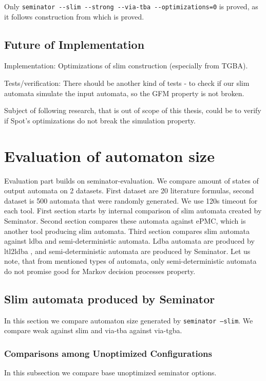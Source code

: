 \documentclass[
	digital,
nolof, nolot
]{fithesis3}
\begin{document}
	Only \texttt{seminator -{}-slim -{}-strong -{}-via-tba -{}-optimizations=0} is proved, as it follows construction from \cite{hlavni} which is proved.
	
	\section{Future of Implementation}
	Implementation:
	Optimizations of slim construction (especially from TGBA).
	
	
	
	Tests/verification:
	There should be another kind of tests - to check if our slim automata simulate the input automata, so the GFM property is not broken.
	
	Subject of following research, that is out of scope of this thesis, could be to verify if Spot's optimizations do not break the simulation property. 
	
	\chapter{Evaluation of automaton size}
	Evaluation part builds on seminator-evaluation. We compare amount of states of output automata on 2 datasets. First dataset are 20 literature formulas, second dataset is 500 automata that were randomly generated. We use 120s timeout for each tool. First section starts by internal comparison of slim automata created by Seminator. Second section compares these automata against ePMC, which is another tool producing slim automata. Third section compares slim automata against ldba and semi-deterministic automata. Ldba automata are produced by ltl2ldba \cite{ltl2ldba}, and semi-deterministic automata are produced by Seminator. Let us note, that from mentioned types of automata, only semi-deterministic automata do not promise good for Markov decision processes property.
	
	\section{Slim automata produced by Seminator}
	In this section we compare automaton size generated by \texttt{seminator --slim}.
	We compare weak against slim and via-tba against via-tgba.
	\subsection{Comparisons among Unoptimized Configurations}
	In this subsection we compare base unoptimized seminator options.
	
\end{document}
